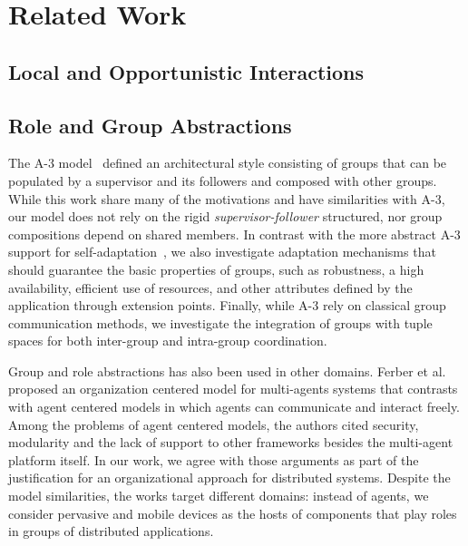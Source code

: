 \section{Related Work}\label{sec:related_work}



\subsection{Local and Opportunistic Interactions}





\subsection{Role and Group Abstractions}


The A-3 model~\cite{Baresi:2011:2} defined an architectural style consisting of groups that can be populated by a supervisor and its followers and composed with other groups. While this work share many of the motivations and have similarities with A-3, our model does not rely on the rigid \textit{supervisor-follower} structured, nor group compositions depend on shared members.
In contrast with the more abstract A-3 support for self-adaptation~\cite{Baresi:2011:2}, we also investigate adaptation mechanisms that should guarantee the basic properties of groups, such as robustness, a high availability, efficient use of resources, and other attributes defined by the application through extension points. Finally, while A-3 rely on classical group communication methods, we investigate the integration of groups with tuple spaces for both inter-group and intra-group coordination.

Group and role abstractions has also been used in other domains. Ferber et al.~\cite{Ferber:2004} proposed an organization centered model for multi-agents systems that contrasts with agent centered models in which agents can communicate and interact freely. Among the problems of agent centered models, the authors cited security, modularity and the lack of support to other frameworks besides the multi-agent platform itself. In our work, we agree with those arguments as part of the justification for an organizational approach for distributed systems. Despite the model similarities, the works target different domains: instead of agents, we consider pervasive and mobile devices as the hosts of components that play roles in groups of distributed applications. %

